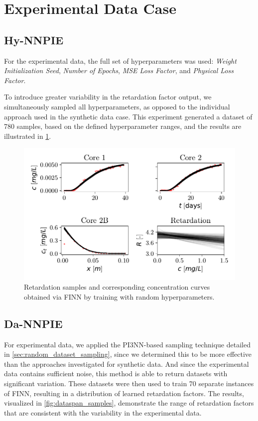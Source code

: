 \section{Experimental Data Case}

\subsection{Hy-NNPIE}
For the experimental data, the full set of hyperparameters was used: \textit{Weight Initialization Seed}, \textit{Number of Epochs}, \textit{MSE Loss Factor}, and \textit{Physical Loss Factor}.

To introduce greater variability in the retardation factor output, we simultaneously sampled all hyperparameters, as opposed to the individual approach used in the synthetic data case. This experiment generated a dataset of 780 samples, based on the defined hyperparameter ranges, and the results are illustrated in \cref{fig:span_samples}.

\begin{figure}[h]
    \centering
    \includegraphics{figs/finn_span_samples.pdf}
    \caption{Retardation samples and corresponding concentration curves obtained via FINN by training with random hyperparameters.}
    \label{fig:span_samples}
\end{figure}



\subsection{Da-NNPIE}
For experimental data, we applied the PI3NN-based sampling technique detailed in \cref{sec:random_dataset_sampling}, since we determined this to be more effective than the approaches investigated for synthetic data. And since the experimental data contains sufficient noise, this method is able to return datasets with significant variation.
These datasets were then used to train 70 separate instances of FINN, resulting in a distribution of learned retardation factors. The results, visualized in \cref{fig:dataspan_samples}, demonstrate the range of retardation factors that are consistent with the variability in the experimental data.


